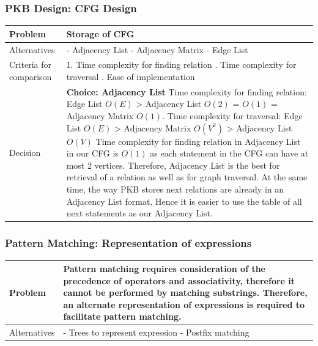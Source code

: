 \documentclass[12pt]{article}
\begin{document}
{{{{{{{{{{{{{\subsubsection{PKB Design: CFG Design}
\begin{tabular}{|L{5cm} | L{12cm}| }
\hline
Problem &
Storage of CFG
 \\
    \hline
    Alternatives &
- Adjacency List
\newline - Adjacency Matrix
\newline - Edge List

 \\
\hline
    Criteria for comparison &
1. Time complexity for finding relation
. Time complexity for traversal
. Ease of implementation
 \\
 \hline
   Decision & \textbf{Choice: Adjacency List}
\newline
Time complexity for finding relation: Edge List $O(E)$ > Adjacency List $O(2)$ = $O(1)$ = Adjacency Matrix $O(1)$. \newline
Time complexity for traversal: Edge List $O(E)$ > Adjacency Matrix $O(V^2)$ > Adjacency List $O(V)$ \newline
Time complexity for finding relation in Adjacency List in our CFG is $O(1)$ as each statement in the CFG can have at most 2 vertices. Therefore, Adjacency List is the best for retrieval of a relation as well as for graph traversal. At the same time, the way PKB stores next relations are already in an Adjacency List format. Hence it is easier to use the table of all next statements as our Adjacency List.

 \\
 \hline
\end{tabular}
\subsubsection{Pattern Matching: Representation of expressions}
\begin{tabular}{|L{5cm} | L{12cm}| }
\hline
Problem &
Pattern matching requires consideration of the precedence of operators and associativity, therefore it cannot be performed by matching substrings. Therefore, an alternate representation of expressions is required to facilitate pattern matching.
 \\
    \hline
    Alternatives &
- Trees to represent expression
\newline - Postfix matching



\end{tabular}}}}}}}}}}}}}}
\end{document}
